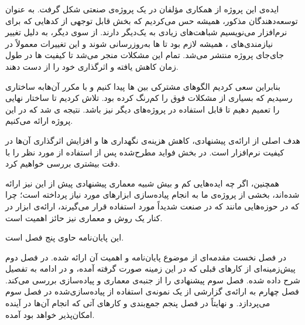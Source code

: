 ایده‌ی این پروژه از همکاری مؤلفان در یک پروژه‌ی صنعتی شکل گرفت. به عنوان توسعه‌دهندگان  مذکور، همیشه حس می‌کردیم که بخش قابل توجهی از کدهایی که برای  نرم‌افزار می‌نویسیم شباهت‌های زیادی به یک‌دیگر دارند.
از سوی دیگر، به دلیل تغییر نیازمندی‌های ، همیشه لازم بود تا ‌ها به‌روزرسانی شوند و این تغییرات معمولاً در جای‌جای پروژه منتشر می‌شد. تمام این مشکلات منجر می‌شد تا کیفیت ‌ها در طول زمان کاهش یافته و اثرگذاری خود را از دست دهند.

بنابراین سعی کردیم الگوهای مشترکی بین ‌ها پیدا کنیم و با  مکرر آن‌هابه ساختاری رسیدیم که بسیاری از مشکلات فوق را کم‌رنگ کرده بود. تلاش کردیم تا ساختار نهایی را تعمیم دهیم تا قابل استفاده در پروژه‌های دیگر نیز باشد. نتیجه  ی شد که در این پروژه ارائه می‌کنیم.

هدف اصلی از ارائه‌ی   پیشنهادی، کاهش هزینه‌ی نگهداری ها و افزایش اثرگذاری آن‌ها در کیفیت نرم‌افزار است. در بخش  فواید مطرح‌شده پس از استفاده از  مورد نظر را با دقت بیشتری بررسی خواهیم کرد.

همچنین، اگر چه ایده‌هایی کم و بیش شبیه معماری پیشنهادی پیش از این نیز ارائه شده‌اند، بخشی از پروژه‌ی ما به انجام پیاده‌سازی ابزارهای مورد نیاز پرداخته است؛ چرا که در حوزه‌هایی مانند  که در صنعت شدیداً مورد استفاده قرار می‌گیرند، ارائه‌ی ابزار در کنار یک روش و معماری نیز حائز اهمیت است.


این پایان‌نامه حاوی پنج فصل است.

در فصل نخست مقدمه‌ای از موضوع پایان‌نامه و اهمیت آن ارائه شده. در فصل دوم پیش‌زمینه‌ای از کارهای قبلی که در این زمینه صورت گرفته آمده، و در ادامه  به تفصیل شرح داده شده. فصل سوم   پیشنهادی را از جنبه‌ی معماری و پیاده‌سازی بررسی می‌کند. فصل چهارم به ارائه‌ی گزارشی از یک نمونه‌ی استفاده از  پیاده‌سازی‌شده در فصل سوم می‌پردازد. و نهایتاً در فصل پنجم جمع‌بندی و کارهای آتی که انجام آن‌ها در آینده امکان‌پذیر خواهد بود آمده.

